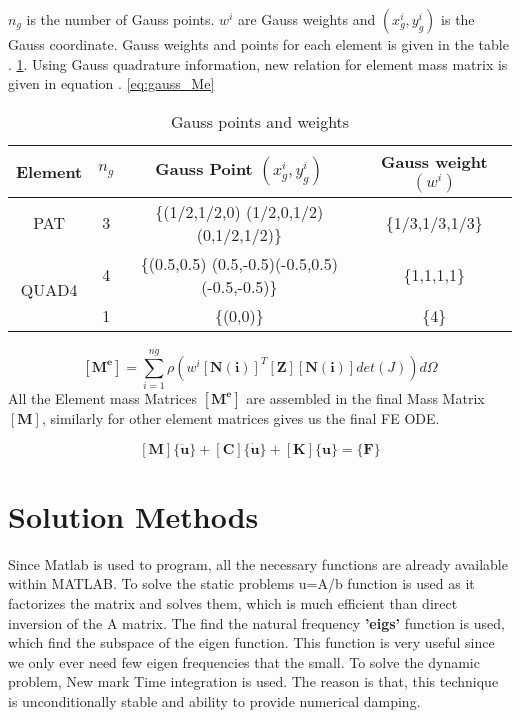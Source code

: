 \documentclass[main.tex]{subfiles}
\begin{document}
$n_g$ is the number of Gauss points. $w^i$ are Gauss weights and $(x_g^i,y_g^i)$ is the Gauss coordinate. Gauss weights and points for each element is given in the table . \ref{tb:gauss}. Using Gauss quadrature information, new relation for element mass matrix is given in equation . \ref{eq:gauss_Me}

\begin{table}[h]
\centering
\begin{tabular}{|c|c|c|c|}
\hline
Element                & $n_g$ & Gauss Point $(x_g^i,y_g^i)$                                   & Gauss weight $(w^i)$   \\ \hline
PAT                    & 3     & \{(1/2,1/2,0) (1/2,0,1/2) (0,1/2,1/2)\}       & \{1/3,1/3,1/3\} \\ \hline
\multirow{2}{*}{QUAD4} & 4     & \{(0.5,0.5) (0.5,-0.5)(-0.5,0.5)(-0.5,-0.5)\} & \{1,1,1,1\}     \\ \cline{2-4} 
                       & 1     & \{(0,0)\}                                     & \{4\}           \\ \hline
\end{tabular}
\caption{Gauss points and weights}
\label{tb:gauss}
\end{table}

\begin{equation}\label{eq:gauss_Me}
\left[ \mathbf{M^e}  \right] 
=
\sum_{i = 1}^{ng}
\rho\left(w^i
\left[ \mathbf{N(i)}  \right]^T
\left[ \mathbf{Z}  \right]
\left[ \mathbf{N(i)}  \right] 
det(J)\right)  d \Omega
\end{equation}
All the Element mass Matrices $\left[ \mathbf{M^e}  \right]$ are assembled in the final Mass Matrix $\left[ \mathbf{M} \right]$, similarly for other element matrices gives us the final FE ODE.



\begin{equation}\label{eq:final-ODE}
\left[ \mathbf{M}  \right] 
\{ \ddot{\mathbf{u}} \}
+
\left[ \mathbf{C}  \right] 
\{ \dot{\mathbf{u}} \}
+
\left[ \mathbf{K}  \right] 
\{\mathbf{u} \}
=
\{ \mathbf{F} \}
\end{equation}



\section{Solution Methods}
Since Matlab is used to program, all the necessary functions are already available within MATLAB. To solve the static problems u=A/b function is used as it factorizes the matrix and solves them, which is much efficient than direct inversion of the A matrix. The find the natural frequency \textbf{'eigs'} function is used, which find the subspace of the eigen function. This function is very useful since we only ever need few eigen frequencies that the small. To solve the dynamic problem, New mark Time integration is used. The reason is that, this technique is unconditionally  stable and ability to provide numerical damping.
\end{document}
